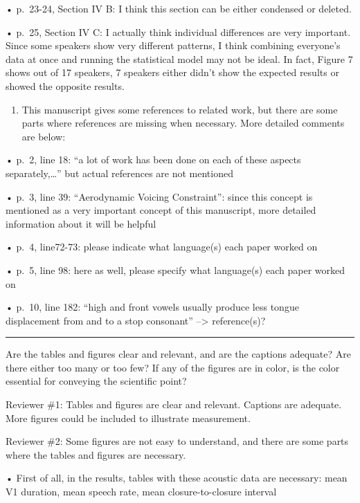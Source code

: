 \documentclass[]{article}
\providecommand{\tightlist}{%
  \setlength{\itemsep}{0pt}\setlength{\parskip}{0pt}}
\begin{document}
• p.~23-24, Section IV B: I think this section can be either condensed
or deleted.

• p.~25, Section IV C: I actually think individual differences are very
important. Since some speakers show very different patterns, I think
combining everyone's data at once and running the statistical model may
not be ideal. In fact, Figure 7 shows out of 17 speakers, 7 speakers
either didn't show the expected results or showed the opposite results.

\begin{enumerate}
\def\labelenumi{\arabic{enumi}.}
\setcounter{enumi}{1}
\tightlist
\item
  This manuscript gives some references to related work, but there are
  some parts where references are missing when necessary. More detailed
  comments are below:
\end{enumerate}

• p.~2, line 18: ``a lot of work has been done on each of these aspects
separately,\ldots{}'' but actual references are not mentioned

• p.~3, line 39: ``Aerodynamic Voicing Constraint'': since this concept
is mentioned as a very important concept of this manuscript, more
detailed information about it will be helpful

• p.~4, line72-73: please indicate what language(s) each paper worked on

• p.~5, line 98: here as well, please specify what language(s) each
paper worked on

• p.~10, line 182: ``high and front vowels usually produce less tongue
displacement from and to a stop consonant'' --\textgreater{}
reference(s)?

\par

\noindent

\rule{\textwidth}{0.4pt}

Are the tables and figures clear and relevant, and are the captions
adequate? Are there either too many or too few? If any of the figures
are in color, is the color essential for conveying the scientific point?

Reviewer \#1: Tables and figures are clear and relevant. Captions are
adequate. More figures could be included to illustrate measurement.

Reviewer \#2: Some figures are not easy to understand, and there are
some parts where the tables and figures are necessary.

• First of all, in the results, tables with these acoustic data are
necessary: mean V1 duration, mean speech rate, mean closure-to-closure
interval
\end{document}
